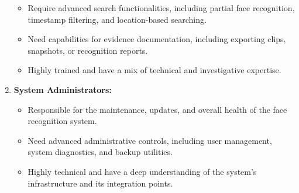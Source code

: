 \documentclass{scrreprt}
\begin{document}
\begin{enumerate}
\begin{itemize}
                    \item Require advanced search functionalities, including partial face recognition, timestamp filtering, and location-based searching.
                    \item Need capabilities for evidence documentation, including exporting clips, snapshots, or recognition reports.
                    \item Highly trained and have a mix of technical and investigative expertise. 
                \end{itemize}
            \item \textbf{System Administrators:}
                \begin{itemize}
                    \item Responsible for the maintenance, updates, and overall health of the face recognition system.
                    \item Need advanced administrative controls, including user management, system diagnostics, and backup utilities.
                    \item Highly technical and have a deep understanding of the system's infrastructure and its integration points.   
                \end{itemize}
            
        \end{enumerate}
    
\end{document}
